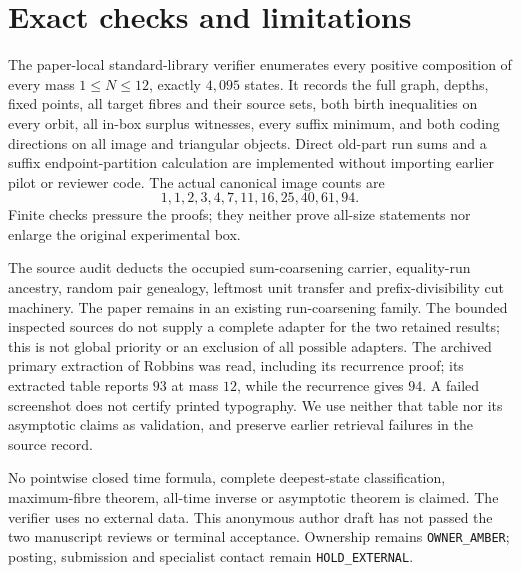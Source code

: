 \section{Exact checks and limitations}
The paper-local standard-library verifier enumerates every positive
composition of every mass $1\le N\le12$, exactly $4{,}095$ states. It
records the full graph, depths, fixed points, all target fibres and their
source sets, both birth inequalities on every orbit, all in-box surplus
witnesses, every suffix minimum, and both coding directions on all image
and triangular objects. Direct old-part run sums and a suffix
endpoint-partition calculation are implemented without importing earlier
pilot or reviewer code. The actual canonical image counts are
\[
 1,1,2,3,4,7,11,16,25,40,61,94.
\]
Finite checks pressure the proofs; they neither prove all-size statements
nor enlarge the original experimental box.

The source audit deducts the occupied sum-coarsening carrier, equality-run
ancestry, random pair genealogy, leftmost unit transfer and prefix-divisibility
cut machinery. The paper remains in an existing run-coarsening family.
The bounded inspected sources do not supply a complete adapter for the
two retained results; this is not global priority or an exclusion of all
possible adapters. The archived primary extraction of Robbins was read,
including its recurrence proof; its extracted table reports $93$ at mass
$12$, while the recurrence gives $94$. A failed screenshot does not
certify printed typography. We use neither that table nor its asymptotic
claims as validation, and preserve earlier retrieval failures in the
source record.

No pointwise closed time formula, complete deepest-state classification,
maximum-fibre theorem, all-time inverse or asymptotic theorem is claimed.
The verifier uses no external data. This anonymous author draft has not
passed the two manuscript reviews or terminal acceptance. Ownership remains
\texttt{OWNER\_AMBER}; posting, submission and specialist contact remain
\texttt{HOLD\_EXTERNAL}.
